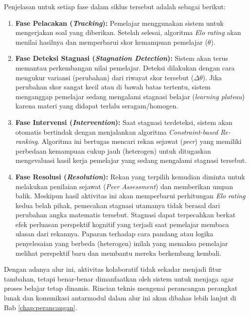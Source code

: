 Penjelasan untuk setiap fase dalam siklus tersebut adalah sebagai berikut:
\begin{enumerate}
    \item \textbf{Fase Pelacakan (\textit{Tracking}):} Pemelajar menggunakan sistem untuk mengerjakan soal yang diberikan. Setelah selesai, algoritma \textit{Elo rating} akan menilai hasilnya dan memperbarui skor kemampuan pemelajar ($\theta$).
    \item \textbf{Fase Deteksi Stagnasi (\textit{Stagnation Detection}):} Sistem akan terus memantau perkembangan nilai pemelajar. Deteksi dilakukan dengan cara mengukur variansi (perubahan) dari riwayat skor tersebut ($\Delta\theta$). Jika perubahan skor sangat kecil atau di bawah batas tertentu, sistem menganggap pemelajar sedang mengalami stagnasi belajar (\textit{learning plateau}) karena materi yang didapat terlalu seragam/homogen.
    \item \textbf{Fase Intervensi (\textit{Intervention}):} Saat stagnasi terdeteksi, sistem akan otomatis bertindak dengan menjalankan algoritma \textit{Constraint-based Re-ranking}. Algoritma ini bertugas mencari rekan sejawat (\textit{peer}) yang memiliki perbedaan kemampuan cukup jauh (heterogen) untuk ditugaskan mengevaluasi hasil kerja pemelajar yang sedang mengalami stagnasi tersebut.
    \item \textbf{Fase Resolusi (\textit{Resolution}):} Rekan yang terpilih kemudian diminta untuk melakukan penilaian sejawat (\textit{Peer Assessment}) dan memberikan umpan balik. Meskipun hasil aktivitas ini akan memperbarui perhitungan \textit{Elo rating} kedua belah pihak, pemecahan stagnasi utamanya tidak berasal dari perubahan angka matematis tersebut. Stagnasi dapat terpecahkan berkat efek perluasan perspektif kognitif yang terjadi saat pemelajar membaca ulasan dari rekannya. Paparan terhadap cara pandang atau logika penyelesaian yang berbeda (heterogen) inilah yang memaksa pemelajar melihat perspektif baru dan membantu mereka berkembang kembali.
\end{enumerate}

Dengan adanya alur ini, aktivitas kolaboratif tidak sekadar menjadi fitur tambahan, tetapi benar-benar dimanfaatkan oleh sistem untuk menjaga agar proses belajar tetap dinamis. Rincian teknis mengenai perancangan perangkat lunak dan komunikasi antarmodul dalam alur ini akan dibahas lebih lanjut di Bab \ref{chap:perancangan}.